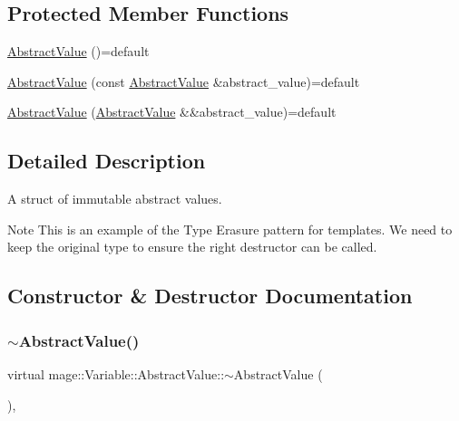\subsection*{Protected Member Functions}
\begin{DoxyCompactItemize}
\item 
\hyperlink{structmage_1_1_variable_1_1_abstract_value_a0a96662d36697af8a17b88f6a2d8efca}{Abstract\+Value} ()=default
\item 
\hyperlink{structmage_1_1_variable_1_1_abstract_value_a09123ab568948a1a8bc7911c65fda422}{Abstract\+Value} (const \hyperlink{structmage_1_1_variable_1_1_abstract_value}{Abstract\+Value} \&abstract\+\_\+value)=default
\item 
\hyperlink{structmage_1_1_variable_1_1_abstract_value_af2decac4e5b5b52c3e6973b39a2dec5b}{Abstract\+Value} (\hyperlink{structmage_1_1_variable_1_1_abstract_value}{Abstract\+Value} \&\&abstract\+\_\+value)=default
\end{DoxyCompactItemize}


\subsection{Detailed Description}
A struct of immutable abstract values.

\begin{DoxyNote}{Note}
This is an example of the Type Erasure pattern for templates. We need to keep the original type to ensure the right destructor can be called. 
\end{DoxyNote}


\subsection{Constructor \& Destructor Documentation}
\hypertarget{structmage_1_1_variable_1_1_abstract_value_a7fa8fc14f81bb26f239af5f1263888a5}{}\label{structmage_1_1_variable_1_1_abstract_value_a7fa8fc14f81bb26f239af5f1263888a5} 
\subsubsection{\texorpdfstring{$\sim$\+Abstract\+Value()}{~AbstractValue()}}
{\footnotesize\ttfamily virtual mage\+::\+Variable\+::\+Abstract\+Value\+::$\sim$\+Abstract\+Value (\begin{DoxyParamCaption}{ }\end{DoxyParamCaption})\hspace{0.3cm}{\ttfamily [virtual]}, {\ttfamily [default]}}

